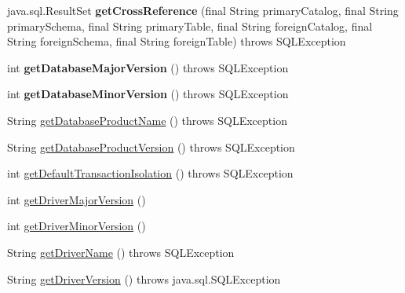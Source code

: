 \begin{DoxyCompactItemize}
java.\+sql.\+Result\+Set {\bfseries get\+Cross\+Reference} (final String primary\+Catalog, final String primary\+Schema, final String primary\+Table, final String foreign\+Catalog, final String foreign\+Schema, final String foreign\+Table)  throws S\+Q\+L\+Exception 
\item 
\mbox{\label{classcom_1_1mysql_1_1cj_1_1jdbc_1_1_database_meta_data_a8e1f681921cbbfb258610a72cfb2d50d}} 
int {\bfseries get\+Database\+Major\+Version} ()  throws S\+Q\+L\+Exception 
\item 
\mbox{\label{classcom_1_1mysql_1_1cj_1_1jdbc_1_1_database_meta_data_afbf2d253f3c8bef74398a609b843526a}} 
int {\bfseries get\+Database\+Minor\+Version} ()  throws S\+Q\+L\+Exception 
\item 
String \mbox{\hyperlink{classcom_1_1mysql_1_1cj_1_1jdbc_1_1_database_meta_data_a3374d9a87f1634e8ef4daade5e30b3a4}{get\+Database\+Product\+Name}} ()  throws S\+Q\+L\+Exception 
\item 
String \mbox{\hyperlink{classcom_1_1mysql_1_1cj_1_1jdbc_1_1_database_meta_data_a995acc5e9c96624f5b8fbac391a53855}{get\+Database\+Product\+Version}} ()  throws S\+Q\+L\+Exception 
\item 
int \mbox{\hyperlink{classcom_1_1mysql_1_1cj_1_1jdbc_1_1_database_meta_data_a7cc0b9e70f46a984306115eae9c08794}{get\+Default\+Transaction\+Isolation}} ()  throws S\+Q\+L\+Exception 
\item 
int \mbox{\hyperlink{classcom_1_1mysql_1_1cj_1_1jdbc_1_1_database_meta_data_a80f700598836ec9d9b8c94fa2baffb36}{get\+Driver\+Major\+Version}} ()
\item 
int \mbox{\hyperlink{classcom_1_1mysql_1_1cj_1_1jdbc_1_1_database_meta_data_a177a5feff862a3f8bd01d19f5ac3f60b}{get\+Driver\+Minor\+Version}} ()
\item 
String \mbox{\hyperlink{classcom_1_1mysql_1_1cj_1_1jdbc_1_1_database_meta_data_aef7cd8cc269e90ceee25e645f9e37f68}{get\+Driver\+Name}} ()  throws S\+Q\+L\+Exception 
\item 
String \mbox{\hyperlink{classcom_1_1mysql_1_1cj_1_1jdbc_1_1_database_meta_data_ae8ee990a19bf7059831d95561dfdc558}{get\+Driver\+Version}} ()  throws java.\+sql.\+S\+Q\+L\+Exception 
\item 
\mbox{\label{classcom_1_1mysql_1_1cj_1_1jdbc_1_1_database_meta_data_a24b648e8b0b81c2e103969a7cb38e60f}} 

\end{DoxyCompactItemize}
